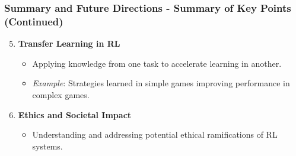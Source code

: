 \documentclass{beamer}
\begin{document}
\begin{frame}[fragile]
    \frametitle{Summary and Future Directions - Summary of Key Points (Continued)}
    
    \begin{enumerate}
        \setcounter{enumi}{4} %

        \item \textbf{Transfer Learning in RL}
            \begin{itemize}
                \item Applying knowledge from one task to accelerate learning in another.
                \item \textit{Example}: Strategies learned in simple games improving performance in complex games.
            \end{itemize}

        \item \textbf{Ethics and Societal Impact}
            \begin{itemize}
                \item Understanding and addressing potential ethical ramifications of RL systems.
            \end{itemize}
    \end{enumerate}

\end{frame}
\end{document}
